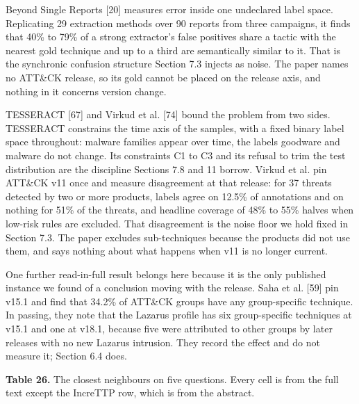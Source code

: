 \documentclass[11pt,a4paper]{article}
\begin{document}
Beyond Single Reports [20] measures error inside one undeclared label space. Replicating 29 extraction methods over 90 reports from three campaigns, it finds that 40\% to 79\% of a strong extractor's false positives share a tactic with the nearest gold technique and up to a third are semantically similar to it. That is the synchronic confusion structure Section 7.3 injects as noise. The paper names no ATT\&CK release, so its gold cannot be placed on the release axis, and nothing in it concerns version change.

TESSERACT [67] and Virkud et al. [74] bound the problem from two sides. TESSERACT constrains the time axis of the samples, with a fixed binary label space throughout: malware families appear over time, the labels goodware and malware do not change. Its constraints C1 to C3 and its refusal to trim the test distribution are the discipline Sections 7.8 and 11 borrow. Virkud et al. pin ATT\&CK v11 once and measure disagreement at that release: for 37 threats detected by two or more products, labels agree on 12.5\% of annotations and on nothing for 51\% of the threats, and headline coverage of 48\% to 55\% halves when low-risk rules are excluded. That disagreement is the noise floor we hold fixed in Section 7.3. The paper excludes sub-techniques because the products did not use them, and says nothing about what happens when v11 is no longer current.

One further read-in-full result belongs here because it is the only published instance we found of a conclusion moving with the release. Saha et al. [59] pin v15.1 and find that 34.2\% of ATT\&CK groups have any group-specific technique. In passing, they note that the Lazarus profile has six group-specific techniques at v15.1 and one at v18.1, because five were attributed to other groups by later releases with no new Lazarus intrusion. They record the effect and do not measure it; Section 6.4 does.

\textbf{Table 26.} The closest neighbours on five questions. Every cell is from the full text except the IncreTTP row, which is from the abstract.
\end{document}
